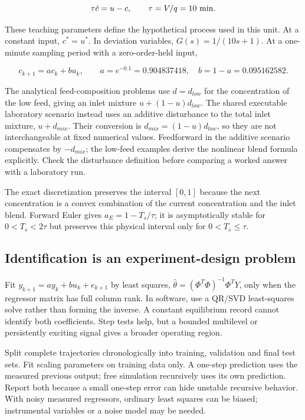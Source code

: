 \documentclass[11pt,a4paper]{article}
\begin{document}
\[\tau\dot c=u-c,\qquad \tau=V/q=10\ {\rm min}.\]

These teaching parameters define the hypothetical process used in this unit. At a constant input, $c^*=u^*$. In deviation variables, $G(s)=1/(10s+1)$. At a one-minute sampling period with a zero-order-held input,


\[c_{k+1}=ac_k+bu_k,\qquad a=e^{-0.1}=0.904837418,\quad b=1-a=0.095162582.\]

The analytical feed-composition problems use $d=d_{low}$ for the concentration of the low feed, giving an inlet mixture $u+(1-u)d_{low}$. The shared executable laboratory scenario instead uses an additive disturbance to the total inlet mixture, $u+d_{mix}$. Their conversion is $d_{mix}=(1-u)d_{low}$, so they are not interchangeable at fixed numerical values. Feedforward in the additive scenario compensates by $-d_{mix}$; the low-feed examples derive the nonlinear blend formula explicitly. Check the disturbance definition before comparing a worked answer with a laboratory run.


The exact discretization preserves the interval $[0,1]$ because the next concentration is a convex combination of the current concentration and the inlet blend. Forward Euler gives $a_E=1-T_s/\tau$; it is asymptotically stable for $0<T_s<2\tau$ but preserves this physical interval only for $0<T_s\leq\tau$.


\subsection{Identification is an experiment-design problem}

Fit $y_{k+1}=ay_k+bu_k+e_{k+1}$ by least squares, $\hat\theta=(\Phi^T\Phi)^{-1}\Phi^TY$, only when the regressor matrix has full column rank. In software, use a QR/SVD least-squares solve rather than forming the inverse. A constant equilibrium record cannot identify both coefficients. Step tests help, but a bounded multilevel or persistently exciting signal gives a broader operating region.


Split complete trajectories chronologically into training, validation and final test sets. Fit scaling parameters on training data only. A one-step prediction uses the measured previous output; free simulation recursively uses its own prediction. Report both because a small one-step error can hide unstable recursive behavior. With noisy measured regressors, ordinary least squares can be biased; instrumental variables or a noise model may be needed.
\end{document}
